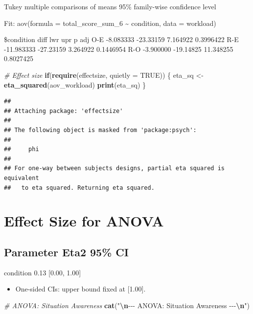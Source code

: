 \documentclass[
]{article}
\newenvironment{Shaded}{\begin{snugshade}}{\end{snugshade}}
\newcommand{\AttributeTok}[1]{\textcolor[rgb]{0.13,0.29,0.53}{#1}}
\newcommand{\CommentTok}[1]{\textcolor[rgb]{0.56,0.35,0.01}{\textit{#1}}}
\newcommand{\ConstantTok}[1]{\textcolor[rgb]{0.56,0.35,0.01}{#1}}
\newcommand{\ControlFlowTok}[1]{\textcolor[rgb]{0.13,0.29,0.53}{\textbf{#1}}}
\newcommand{\FunctionTok}[1]{\textcolor[rgb]{0.13,0.29,0.53}{\textbf{#1}}}
\newcommand{\NormalTok}[1]{#1}
\newcommand{\OtherTok}[1]{\textcolor[rgb]{0.56,0.35,0.01}{#1}}
\newcommand{\SpecialCharTok}[1]{\textcolor[rgb]{0.81,0.36,0.00}{\textbf{#1}}}
\newcommand{\StringTok}[1]{\textcolor[rgb]{0.31,0.60,0.02}{#1}}
\providecommand{\tightlist}{%
  \setlength{\itemsep}{0pt}\setlength{\parskip}{0pt}}
\begin{document}
Tukey multiple comparisons of means 95\% family-wise confidence level

Fit: aov(formula = total\_score\_sum\_6 \textasciitilde{} condition,
data = workload)

\$condition diff lwr upr p adj O-E -8.083333 -23.33159 7.164922
0.3996422 R-E -11.983333 -27.23159 3.264922 0.1446954 R-O -3.900000
-19.14825 11.348255 0.8027425

\begin{Shaded}
\begin{Highlighting}[]
\CommentTok{\# Effect size}
\ControlFlowTok{if}\NormalTok{(}\FunctionTok{require}\NormalTok{(effectsize, }\AttributeTok{quietly =} \ConstantTok{TRUE}\NormalTok{)) \{}
\NormalTok{  eta\_sq }\OtherTok{\textless{}{-}} \FunctionTok{eta\_squared}\NormalTok{(aov\_workload)}
  \FunctionTok{print}\NormalTok{(eta\_sq)}
\NormalTok{\}}
\end{Highlighting}
\end{Shaded}

\begin{verbatim}
## 
## Attaching package: 'effectsize'
## 
## The following object is masked from 'package:psych':
## 
##     phi
## 
## For one-way between subjects designs, partial eta squared is equivalent
##   to eta squared. Returning eta squared.
\end{verbatim}

\section{Effect Size for ANOVA}\label{effect-size-for-anova}

\subsection{Parameter \textbar{} Eta2 \textbar{} 95\%
CI}\label{parameter-eta2-95-ci}

condition \textbar{} 0.13 \textbar{} {[}0.00, 1.00{]}

\begin{itemize}
\tightlist
\item
  One-sided CIs: upper bound fixed at {[}1.00{]}.
\end{itemize}

\begin{Shaded}
\begin{Highlighting}[]
\CommentTok{\# ANOVA: Situation Awareness}
\FunctionTok{cat}\NormalTok{(}\StringTok{"}\SpecialCharTok{\textbackslash{}n}\StringTok{{-}{-}{-} ANOVA: Situation Awareness {-}{-}{-}}\SpecialCharTok{\textbackslash{}n}\StringTok{"}\NormalTok{)}
\end{Highlighting}
\end{Shaded}
\end{document}
